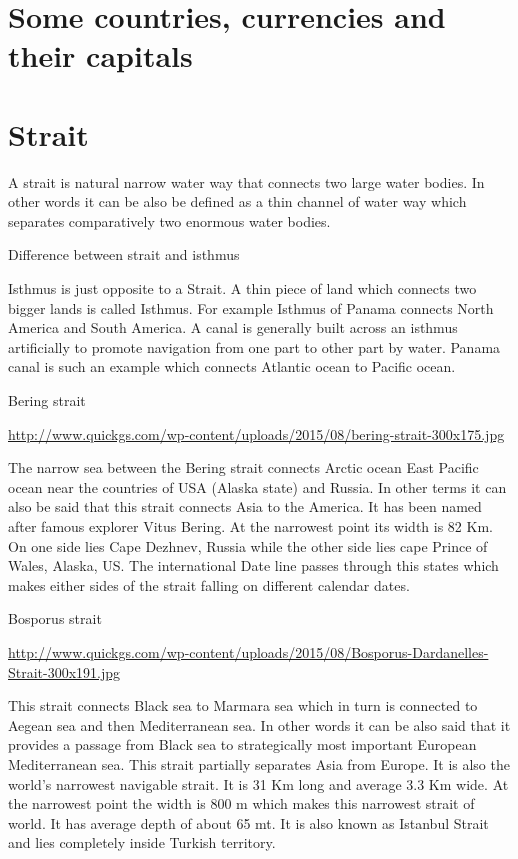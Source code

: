 \documentclass[
  openany]{book}
\begin{document}
\hypertarget{some-countries-currencies-and-their-capitals}{%
\section{Some countries, currencies and their capitals}\label{some-countries-currencies-and-their-capitals}}

\hypertarget{strait}{%
\section{Strait}\label{strait}}

A strait is natural narrow water way that connects two large water bodies. In other words it can be also be defined as a thin channel of water way which separates comparatively two enormous water bodies.

Difference between strait and isthmus

Isthmus is just opposite to a Strait. A thin piece of land which connects two bigger lands is called Isthmus. For example Isthmus of Panama connects North America and South America. A canal is generally built across an isthmus artificially to promote navigation from one part to other part by water. Panama canal is such an example which connects Atlantic ocean to Pacific ocean.

Bering strait

\url{http://www.quickgs.com/wp-content/uploads/2015/08/bering-strait-300x175.jpg}

The narrow sea between the Bering strait connects Arctic ocean East Pacific ocean near the countries of USA (Alaska state) and Russia. In other terms it can also be said that this strait connects Asia to the America. It has been named after famous explorer Vitus Bering. At the narrowest point its width is 82 Km. On one side lies Cape Dezhnev, Russia while the other side lies cape Prince of Wales, Alaska, US. The international Date line passes through this states which makes either sides of the strait falling on different calendar dates.

Bosporus strait

\url{http://www.quickgs.com/wp-content/uploads/2015/08/Bosporus-Dardanelles-Strait-300x191.jpg}

This strait connects Black sea to Marmara sea which in turn is connected to Aegean sea and then Mediterranean sea. In other words it can be also said that it provides a passage from Black sea to strategically most important European Mediterranean sea. This strait partially separates Asia from Europe. It is also the world's narrowest navigable strait. It is 31 Km long and average 3.3 Km wide. At the narrowest point the width is 800 m which makes this narrowest strait of world. It has average depth of about 65 mt. It is also known as Istanbul Strait and lies completely inside Turkish territory.
\end{document}
